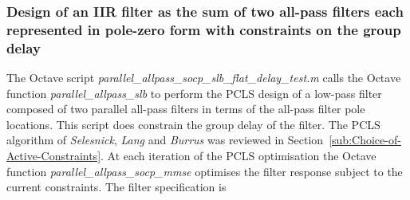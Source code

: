 \documentclass[a4paper,twoside,10pt,english]{report}
\begin{document}
\subsubsection{\label{sec:Design-IIR-filter-sum-all-pass filters-pole-zero-constrained-group-delay}Design of an IIR filter as the sum of two all-pass filters each represented in pole-zero form with constraints on the group delay}
The Octave script \emph{parallel\_allpass\_socp\_slb\_flat\_delay\_test.m} calls 
the Octave function \emph{parallel\_allpass\_slb} to perform the PCLS design of
a low-pass filter composed of two parallel all-pass filters in terms of the 
all-pass filter pole locations. This script does constrain the group delay of 
the filter. The PCLS algorithm of \emph{Selesnick}, \emph{Lang} and 
\emph{Burrus} was reviewed in Section~\ref{sub:Choice-of-Active-Constraints}. At
each iteration of the PCLS optimisation the Octave function 
\emph{parallel\_allpass\_socp\_mmse} optimises the filter response subject to 
the current constraints. The filter specification is
\begin{small}

\end{small}
\end{document}
